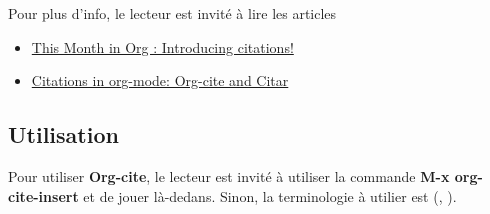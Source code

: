 \documentclass{article}
\numberwithin{equation}{section}
\begin{document}
Pour plus d'info, le lecteur est invité à lire les articles
\begin{itemize}
\item \href{https://blog.tecosaur.com/tmio/2021-07-31-citations.html}{This Month in Org : Introducing citations!}
\item \href{https://kristofferbalintona.me/posts/202206141852/}{Citations in org-mode: Org-cite and Citar}
\end{itemize}

\subsection{Utilisation}
\label{sec:orge8871e6}
Pour utiliser \textbf{Org-cite}, le lecteur est invité à utiliser la commande
\textbf{M-x org-cite-insert} et de jouer là-dedans.
Sinon, la terminologie à utilier est (, ). 
\end{document}
